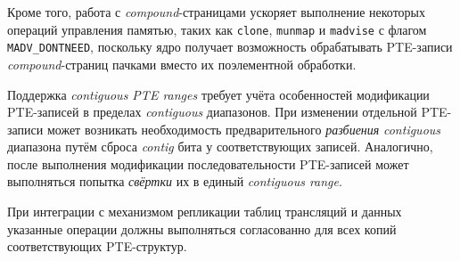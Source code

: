 Кроме того, работа с \textit{compound}-страницами ускоряет выполнение некоторых операций управления памятью, таких как \texttt{clone}, \texttt{munmap} и \texttt{madvise} с флагом \texttt{MADV\_DONTNEED}, поскольку ядро получает возможность обрабатывать PTE-записи \textit{compound}-страниц пачками вместо их поэлементной обработки.

Поддержка \textit{contiguous PTE ranges} требует учёта особенностей модификации PTE-записей в пределах \textit{contiguous} диапазонов. При изменении отдельной PTE-записи может возникать необходимость предварительного \textit{разбиения} \textit{contiguous} диапазона путём сброса \textit{contig} бита у соответствующих записей. Аналогично, после выполнения модификации последовательности PTE-записей может выполняться попытка \textit{свёртки} их в единый \textit{contiguous range}.

При интеграции с механизмом репликации таблиц трансляций и данных указанные операции должны выполняться согласованно для всех копий соответствующих PTE-структур.
